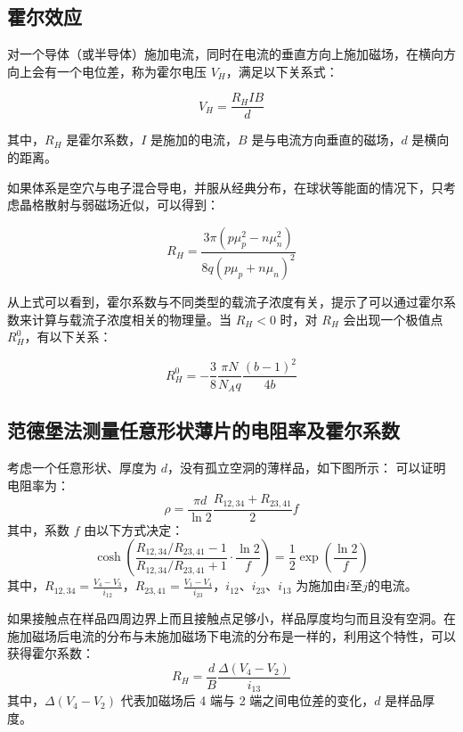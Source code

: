 \documentclass[font=default]{mpltx}
\begin{document}
\subsection{霍尔效应}
对一个导体（或半导体）施加电流，同时在电流的垂直方向上施加磁场，在横向方向上会有一个电位差，称为霍尔电压 $V_H$，满足以下关系式：

$$V_H = \frac{R_H I B}{d}$$

其中，$R_H$ 是霍尔系数，$I$ 是施加的电流，$B$ 是与电流方向垂直的磁场，$d$ 是横向的距离。

如果体系是空穴与电子混合导电，并服从经典分布，在球状等能面的情况下，只考虑晶格散射与弱磁场近似，可以得到：

$$R_H = \frac{3\pi(p\mu_p^2 - n\mu_n^2)}{8q(p\mu_p + n\mu_n)^2}$$

从上式可以看到，霍尔系数与不同类型的载流子浓度有关，提示了可以通过霍尔系数来计算与载流子浓度相关的物理量。当 $R_H<0$ 时，对 $R_H$ 会出现一个极值点 $R^0_H$，有以下关系：

$$R^0_H = -\frac{3}{8}\frac{\pi N}{N_Aq}\frac{(b-1)^2}{4b}$$

\subsection{范德堡法测量任意形状薄片的电阻率及霍尔系数}
考虑一个任意形状、厚度为 $d$，没有孤立空洞的薄样品，如下图所示：
可以证明电阻率为：
\begin{equation}
\rho = \frac{\pi d}{\ln 2}\frac{R_{12,34} + R_{23,41}}{2}f
\end{equation}
其中，系数 $f$ 由以下方式决定：
\begin{equation}
\cosh{(\frac{R_{12,34}/R_{23,41}-1}{R_{12,34}/R_{23,41}+1}\cdot\frac{\ln2}{f})} = \frac{1}{2}\exp\left(\frac{\ln 2}{f}\right)
\end{equation}
其中，$R_{12,34}=\frac{V_4-V_3}{i_{12}}$，$R_{23,41}=\frac{V_1-V_4}{i_{23}}$，$i_{12}$、$i_{23}$、$i_{13}$ 为施加由$i$至$j$的电流。

如果接触点在样品四周边界上而且接触点足够小，样品厚度均匀而且没有空洞。在施加磁场后电流的分布与未施加磁场下电流的分布是一样的，利用这个特性，可以获得霍尔系数：
\begin{equation}
R_H=\frac{d}{B}\frac{\Delta(V_4-V_2)}{i_{13}}
\end{equation}
其中，$\Delta(V_4-V_2)$ 代表加磁场后 4 端与 2 端之间电位差的变化，$d$ 是样品厚度。
\end{document}
